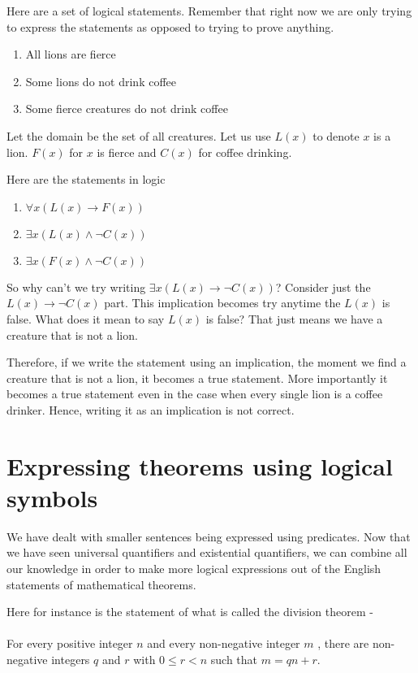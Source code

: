 \documentclass[12pt]{article}
\begin{document}
Here are a set of logical statements. Remember that right now we are only trying to express the statements as opposed to trying to prove anything.

\begin{enumerate}
\item All lions are fierce
\item Some lions do not drink coffee
\item Some fierce creatures do not drink coffee
\end{enumerate}

Let the domain be the set of all creatures. Let us use $L(x)$ to denote $x$ is a lion. $F(x)$ for $x$ is fierce and $C(x)$ for coffee drinking.

Here are the statements in logic

\begin{enumerate}
\item $\forall x (L(x) \rightarrow F(x))$
\item $\exists x (L(x) \wedge \neg C(x))$
\item $\exists x (F(x) \wedge \neg C(x))$
\end{enumerate}

So why can't we try writing $\exists x (L(x) \rightarrow \neg C(x))$? Consider just the $L(x) \rightarrow \neg C(x)$ part. This implication becomes try anytime the $L(x)$ is false.  What does it mean to say $L(x)$ is false? That just means we have a creature that is not a lion.

Therefore, if we write the statement using an implication, the moment we find a creature that is not a lion, it becomes a true statement. More importantly it becomes a true statement even in the case when every single lion is a coffee drinker. Hence, writing it as an implication is not correct.

\section*{Expressing theorems using logical symbols}

We have dealt with smaller sentences being expressed using predicates. Now that we have seen universal quantifiers and existential quantifiers, we can combine all our knowledge in order to make more logical expressions out of the English statements of mathematical theorems. 

Here for instance is the statement of what is called the division theorem - 

\paragraph{}
For every positive integer $n$  and every non-negative integer $m$ , there are non-negative integers $q$ and $r$ with $0 \le r < n$ such that $m = qn + r$.
\end{document}
